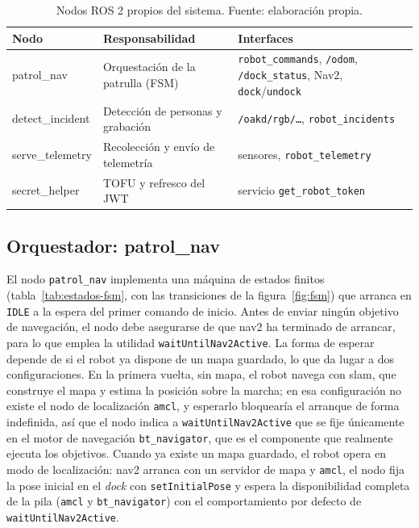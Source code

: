 \begin{table}[htbp]
  \centering
  \small
  \caption{Nodos ROS 2 propios del sistema. Fuente: elaboración propia.}
  \label{tab:nodos}
  \begin{tabular}{@{}>{\ttfamily}l >{\raggedright\arraybackslash}p{5.0cm}
                     >{\raggedright\arraybackslash}p{4.0cm}@{}}
    \toprule
    \textbf{\normalfont Nodo} & \textbf{Responsabilidad} &
    \textbf{Interfaces} \\
    \midrule
    patrol\_nav      & Orquestación de la patrulla (FSM) &
    \texttt{robot\_commands}, \texttt{/odom}, \texttt{/dock\_status}, Nav2, \texttt{dock}/\texttt{undock} \\
    detect\_incident & Detección de personas y grabación &
    \texttt{/oakd/rgb/\dots}, \texttt{robot\_incidents} \\
    serve\_telemetry & Recolección y envío de telemetría &
    sensores, \texttt{robot\_telemetry} \\
    secret\_helper   & TOFU y refresco del JWT &
    servicio \texttt{get\_robot\_token} \\
    \bottomrule
  \end{tabular}
\end{table}

\subsection{Orquestador: patrol\_nav}
\label{sec:patrol-nav}

El nodo \texttt{patrol\_nav} implementa una máquina de estados finitos
(tabla~\ref{tab:estados-fsm}, con las transiciones de la figura~\ref{fig:fsm}) que
arranca en \texttt{IDLE} a la espera del primer comando de inicio. Antes de enviar
ningún objetivo de navegación, el nodo debe asegurarse de que \gls{nav2} ha terminado
de arrancar, para lo que emplea la utilidad \texttt{waitUntilNav2Active}. La forma de
esperar depende de si el robot ya dispone de un mapa guardado, lo que da lugar a dos
configuraciones. En la primera vuelta, sin mapa, el robot navega con \gls{slam}, que
construye el mapa y estima la posición sobre la marcha; en esa configuración no existe
el nodo de localización \texttt{amcl}, y esperarlo bloquearía el arranque de forma
indefinida, así que el nodo indica a \texttt{waitUntilNav2Active} que se fije
únicamente en el motor de navegación \texttt{bt\_navigator}, que es el componente que
realmente ejecuta los objetivos. Cuando ya existe un mapa guardado, el robot opera en
modo de localización: \gls{nav2} arranca con un servidor de mapa y \texttt{amcl}, el
nodo fija la pose inicial en el \textit{dock} con \texttt{setInitialPose} y espera la
disponibilidad completa de la pila (\texttt{amcl} y \texttt{bt\_navigator}) con el
comportamiento por defecto de \texttt{waitUntilNav2Active}.

